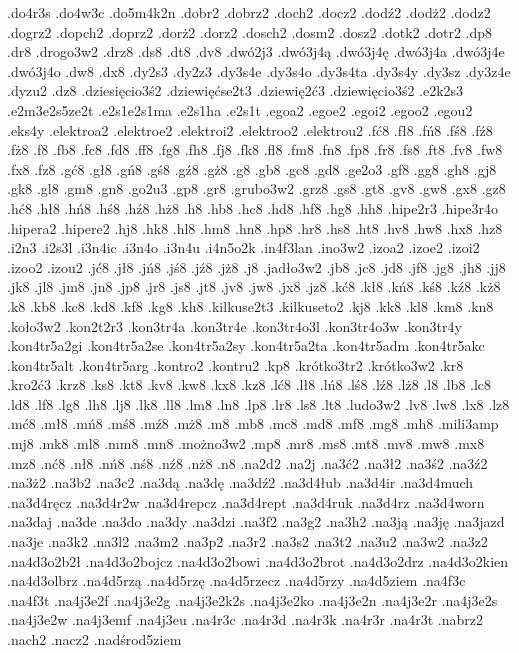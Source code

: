 {.do4r3s
.do4w3c
.do5m4k2n
.dobr2
.dobrz2
.doch2
.docz2
.dodź2
.dodż2
.dodz2
.dogrz2
.dopch2
.doprz2
.dorż2
.dorz2
.dosch2
.dosm2
.dosz2
.dotk2
.dotr2
.dp8
.dr8
.drogo3w2
.drz8
.ds8
.dt8
.dv8
.dwó2j3
.dwó3j4ą
.dwó3j4ę
.dwó3j4a
.dwó3j4e
.dwó3j4o
.dw8
.dx8
.dy2s3
.dy2z3
.dy3s4e
.dy3s4o
.dy3s4ta
.dy3s4y
.dy3sz
.dy3z4e
.dyzu2
.dz8
.dziesięcio3ś2
.dziewięćse2t3
.dziewię2ć3
.dziewięcio3ś2
.e2k2s3
.e2m3e2s5ze2t
.e2s1e2s1ma
.e2s1ha
.e2s1t
.egoa2
.egoe2
.egoi2
.egoo2
.egou2
.eks4y
.elektroa2
.elektroe2
.elektroi2
.elektroo2
.elektrou2
.fć8
.fł8
.fń8
.fś8
.fź8
.fż8
.f8
.fb8
.fc8
.fd8
.ff8
.fg8
.fh8
.fj8
.fk8
.fl8
.fm8
.fn8
.fp8
.fr8
.fs8
.ft8
.fv8
.fw8
.fx8
.fz8
.gć8
.gł8
.gń8
.gś8
.gź8
.gż8
.g8
.gb8
.gc8
.gd8
.ge2o3
.gf8
.gg8
.gh8
.gj8
.gk8
.gl8
.gm8
.gn8
.go2u3
.gp8
.gr8
.grubo3w2
.grz8
.gs8
.gt8
.gv8
.gw8
.gx8
.gz8
.hć8
.hł8
.hń8
.hś8
.hź8
.hż8
.h8
.hb8
.hc8
.hd8
.hf8
.hg8
.hh8
.hipe2r3
.hipe3r4o
.hipera2
.hipere2
.hj8
.hk8
.hl8
.hm8
.hn8
.hp8
.hr8
.hs8
.ht8
.hv8
.hw8
.hx8
.hz8
.i2n3
.i2s3l
.i3n4ic
.i3n4o
.i3n4u
.i4n5o2k
.in4f3lan
.ino3w2
.izoa2
.izoe2
.izoi2
.izoo2
.izou2
.jć8
.jł8
.jń8
.jś8
.jź8
.jż8
.j8
.jadło3w2
.jb8
.jc8
.jd8
.jf8
.jg8
.jh8
.jj8
.jk8
.jl8
.jm8
.jn8
.jp8
.jr8
.js8
.jt8
.jv8
.jw8
.jx8
.jz8
.kć8
.kł8
.kń8
.kś8
.kź8
.kż8
.k8
.kb8
.kc8
.kd8
.kf8
.kg8
.kh8
.kilkuse2t3
.kilkuseto2
.kj8
.kk8
.kl8
.km8
.kn8
.koło3w2
.kon2t2r3
.kon3tr4a
.kon3tr4e
.kon3tr4o3l
.kon3tr4o3w
.kon3tr4y
.kon4tr5a2gi
.kon4tr5a2se
.kon4tr5a2sy
.kon4tr5a2ta
.kon4tr5adm
.kon4tr5akc
.kon4tr5alt
.kon4tr5arg
.kontro2
.kontru2
.kp8
.krótko3tr2
.krótko3w2
.kr8
.kro2ć3
.krz8
.ks8
.kt8
.kv8
.kw8
.kx8
.kz8
.lć8
.lł8
.lń8
.lś8
.lź8
.lż8
.l8
.lb8
.lc8
.ld8
.lf8
.lg8
.lh8
.lj8
.lk8
.ll8
.lm8
.ln8
.lp8
.lr8
.ls8
.lt8
.ludo3w2
.lv8
.lw8
.lx8
.lz8
.mć8
.mł8
.mń8
.mś8
.mź8
.mż8
.m8
.mb8
.mc8
.md8
.mf8
.mg8
.mh8
.mili3amp
.mj8
.mk8
.ml8
.mm8
.mn8
.możno3w2
.mp8
.mr8
.ms8
.mt8
.mv8
.mw8
.mx8
.mz8
.nć8
.nł8
.nń8
.nś8
.nź8
.nż8
.n8
.na2d2
.na2j
.na3ć2
.na3ł2
.na3ś2
.na3ź2
.na3ż2
.na3b2
.na3c2
.na3dą
.na3dę
.na3dź2
.na3d4łub
.na3d4ir
.na3d4much
.na3d4ręcz
.na3d4r2w
.na3d4repcz
.na3d4rept
.na3d4ruk
.na3d4rz
.na3d4worn
.na3daj
.na3de
.na3do
.na3dy
.na3dzi
.na3f2
.na3g2
.na3h2
.na3ją
.na3ję
.na3jazd
.na3je
.na3k2
.na3l2
.na3m2
.na3p2
.na3r2
.na3s2
.na3t2
.na3u2
.na3w2
.na3z2
.na4d3o2b2ł
.na4d3o2bojcz
.na4d3o2bowi
.na4d3o2brot
.na4d3o2drz
.na4d3o2kien
.na4d3olbrz
.na4d5rzą
.na4d5rzę
.na4d5rzecz
.na4d5rzy
.na4d5ziem
.na4f3c
.na4f3t
.na4j3e2f
.na4j3e2g
.na4j3e2k2s
.na4j3e2ko
.na4j3e2n
.na4j3e2r
.na4j3e2s
.na4j3e2w
.na4j3emf
.na4j3eu
.na4r3c
.na4r3d
.na4r3k
.na4r3r
.na4r3t
.nabrz2
.nach2
.nacz2
.nadśrod5ziem
}
